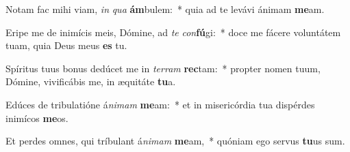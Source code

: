 \item Notam fac mihi viam, \textit{in} \textit{qua} \textbf{ám}bulem:~* quia ad te levávi ánimam \textbf{me}am.
\item Eripe me de inimícis meis, Dómine, ad \textit{te} \textit{con}\textbf{fú}gi:~* doce me fácere voluntátem tuam, quia Deus meus \textbf{es} tu.
\item Spíritus tuus bonus dedúcet me in \textit{ter}\textit{ram} \textbf{rec}tam:~* propter nomen tuum, Dómine, vivificábis me, in æquitáte \textbf{tu}a.
\item Edúces de tribulatióne á\textit{ni}\textit{mam} \textbf{me}am:~* et in misericórdia tua dispérdes inimícos \textbf{me}os.
\item Et perdes omnes, qui tríbulant á\textit{ni}\textit{mam} \textbf{me}am,~* quóniam ego servus \textbf{tu}us sum.

